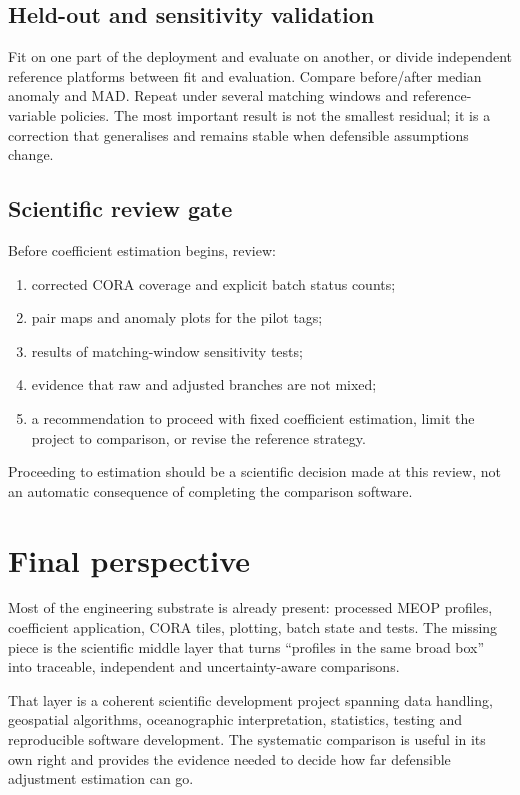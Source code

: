 \documentclass[11pt,a4paper]{article}
\begin{document}
\subsection{Held-out and sensitivity validation}

Fit on one part of the deployment and evaluate on another, or divide independent
reference platforms between fit and evaluation. Compare before/after median anomaly and
MAD. Repeat under several matching windows and reference-variable policies. The most
important result is not the smallest residual; it is a correction that generalises and
remains stable when defensible assumptions change.

\subsection{Scientific review gate}

Before coefficient estimation begins, review:

\begin{enumerate}[leftmargin=1.6em]
  \item corrected CORA coverage and explicit batch status counts;
  \item pair maps and anomaly plots for the pilot tags;
  \item results of matching-window sensitivity tests;
  \item evidence that raw and adjusted branches are not mixed;
  \item a recommendation to proceed with fixed coefficient estimation, limit the
  project to comparison, or revise the reference strategy.
\end{enumerate}

Proceeding to estimation should be a scientific decision made at this review, not an
automatic consequence of completing the comparison software.

\section{Final perspective}

Most of the engineering substrate is already present: processed MEOP profiles,
coefficient application, CORA tiles, plotting, batch state and tests. The missing piece
is the scientific middle layer that turns ``profiles in the same broad box'' into
traceable, independent and uncertainty-aware comparisons.

That layer is a coherent scientific development project spanning data handling,
geospatial algorithms, oceanographic interpretation, statistics, testing and
reproducible software development. The systematic comparison is useful in its own
right and provides the evidence needed to decide how far defensible adjustment
estimation can go.
\end{document}
